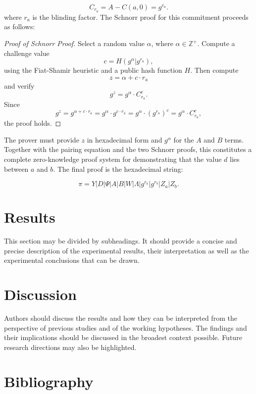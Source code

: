\documentclass[version=preprint]{iacrcc}
\begin{document}
\begin{equation}
C_{r_a} = A - C(a, 0) = g^{r_{a}}.
\end{equation}
where \( r_{a} \) is the blinding factor. The Schnorr proof for this commitment proceeds as follows:

\begin{proof}[Proof of Schnorr Proof]
Select a random value \( \alpha \), where \( \alpha \in \mathbb{Z}^+ \). Compute a challenge value
\begin{equation}
c = H(g^{\alpha} | g^{r_{a}}), 
\end{equation}
using the Fiat-Shamir heuristic and a public hash function \( H \). Then compute 
\begin{equation}
z = \alpha + c \cdot r_{a}
\end{equation}
and verify
\begin{equation}
g^{z} = g^{\alpha} \cdot C_{r_a}^{c}.
\end{equation}
Since 
\begin{equation}
g^{z} = g^{\alpha + c \cdot r_{a}} = g^{\alpha} \cdot g^{c \cdot r_{a}} = g^{\alpha} \cdot (g^{r_{a}})^{c} = g^{\alpha} \cdot C_{r_a}^{c},
\end{equation}
the proof holds.
\end{proof}

The prover must provide \( z \) in hexadecimal form and \( g^{\alpha} \) for the \( A \) and \( B \) terms. Together with the pairing equation and the two Schnorr proofs, this constitutes a complete zero-knowledge proof system for demonstrating that the value \( d \) lies between \( a \) and \( b \). The final proof is the hexadecimal string:

\begin{equation}
\pi = Y | D | \Psi | A | B | W | \Lambda | g^{r_{a}} | g^{r_{b}} | Z_{a} | Z_{b}.
\end{equation}

\section{Results}

This section may be divided by subheadings. It should provide a concise and precise description of the experimental results, their interpretation as well as the experimental conclusions that can be drawn.


\section{Discussion}

Authors should discuss the results and how they can be interpreted from the perspective of previous studies and of the working hypotheses. The findings and their implications should be discussed in the broadest context possible. Future research directions may also be highlighted.

\section{Bibliography}

\end{document}
